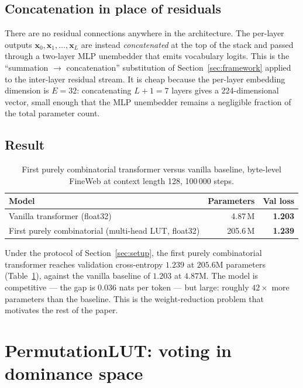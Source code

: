 \documentclass[11pt]{article}
\begin{document}
\subsection{Concatenation in place of residuals}

There are no residual connections anywhere in the architecture.
The per-layer outputs $\mathbf{x}_0, \mathbf{x}_1, \ldots, \mathbf{x}_L$ are instead \emph{concatenated} at the top of the stack and passed through a two-layer MLP unembedder that emits vocabulary logits.
This is the ``summation $\to$ concatenation'' substitution of Section~\ref{sec:framework} applied to the inter-layer residual stream.
It is cheap because the per-layer embedding dimension is $E = 32$: concatenating $L + 1 = 7$ layers gives a 224-dimensional vector, small enough that the MLP unembedder remains a negligible fraction of the total parameter count.

\subsection{Result}

\begin{table}[!t]
\caption{First purely combinatorial transformer versus vanilla baseline, byte-level FineWeb at context length 128, 100\,000 steps.}
\label{tab:first_combinatorial}
\centering
\begin{tabular}{lrr}
\toprule
Model & Parameters & Val loss \\
\midrule
Vanilla transformer (float32)             & 4.87\,M    & \textbf{1.203} \\
First purely combinatorial (multi-head LUT, float32) & 205.6\,M   & \textbf{1.239} \\
\bottomrule
\end{tabular}
\end{table}

Under the protocol of Section~\ref{sec:setup}, the first purely combinatorial transformer reaches validation cross-entropy $1.239$ at $205.6$M parameters (Table~\ref{tab:first_combinatorial}), against the vanilla baseline of $1.203$ at $4.87$M.
The model is competitive --- the gap is $0.036$ nats per token --- but large: roughly $42\times$ more parameters than the baseline.
This is the weight-reduction problem that motivates the rest of the paper.


\section{PermutationLUT: voting in dominance space}
\label{sec:permlut}
\end{document}
